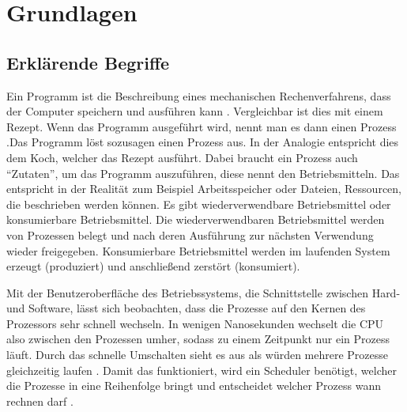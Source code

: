 \chapter{Grundlagen}
\label{grundlagen}
\section{Erklärende Begriffe}
\label{sec:begriffe}
Ein Programm ist die Beschreibung eines mechanischen Rechenverfahrens, dass der Computer speichern und ausführen kann \parencite[vgl.][14]{rechenberg2000}. Vergleichbar ist dies mit einem Rezept. Wenn das Programm ausgeführt wird, nennt man es dann einen Prozess \parencite[vgl.][S.71]{tanenbaum2016}.Das Programm löst sozusagen einen Prozess aus. In der Analogie entspricht dies dem Koch, welcher das Rezept ausführt.  Dabei braucht ein Prozess auch “Zutaten”, um das Programm auszuführen, diese nennt den Betriebsmitteln. Das entspricht in der Realität zum Beispiel Arbeitsspeicher oder Dateien, Ressourcen, die beschrieben werden können. Es gibt wiederverwendbare Betriebsmittel oder konsumierbare Betriebsmittel. Die wiederverwendbaren Betriebsmittel werden von Prozessen belegt und nach deren Ausführung zur nächsten Verwendung  wieder freigegeben. Konsumierbare Betriebsmittel werden im laufenden System erzeugt (produziert) und anschließend zerstört (konsumiert).


Mit der Benutzeroberfläche des Betriebssystems, die Schnittstelle zwischen Hard- und Software, lässt sich beobachten, dass die Prozesse auf den Kernen des Prozessors sehr schnell wechseln. In wenigen Nanosekunden wechselt die CPU also zwischen den Prozessen umher, sodass zu einem Zeitpunkt nur ein Prozess läuft. Durch das schnelle Umschalten sieht es aus als würden mehrere Prozesse gleichzeitig laufen \parencite[vgl.][S.466]{sommer2002}. Damit  das funktioniert, wird ein Scheduler benötigt, welcher die Prozesse in eine Reihenfolge bringt und entscheidet welcher Prozess wann rechnen darf \parencite[vgl.][S.199]{tanenbaum2016}.

